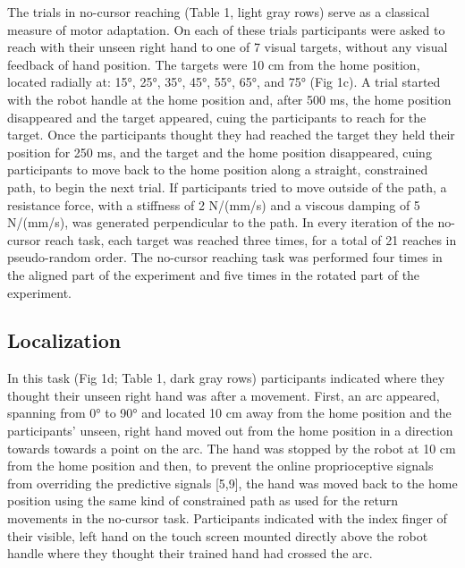 \documentclass[10pt,letterpaper]{article}
\begin{document}
The trials in no-cursor reaching (Table 1, light gray rows) serve as a
classical measure of motor adaptation. On each of these trials
participants were asked to reach with their unseen right hand to one of
7 visual targets, without any visual feedback of hand position. The
targets were 10 cm from the home position, located radially at: 15°,
25°, 35°, 45°, 55°, 65°, and 75° (Fig 1c). A trial started with the
robot handle at the home position and, after 500 ms, the home position
disappeared and the target appeared, cuing the participants to reach for
the target. Once the participants thought they had reached the target
they held their position for 250 ms, and the target and the home
position disappeared, cuing participants to move back to the home
position along a straight, constrained path, to begin the next trial. If
participants tried to move outside of the path, a resistance force, with
a stiffness of 2 N/(mm/s) and a viscous damping of 5 N/(mm/s), was
generated perpendicular to the path. In every iteration of the no-cursor
reach task, each target was reached three times, for a total of 21
reaches in pseudo-random order. The no-cursor reaching task was
performed four times in the aligned part of the experiment and five
times in the rotated part of the experiment.

\subsection{Localization}\label{localization}

In this task (Fig 1d; Table 1, dark gray rows) participants indicated
where they thought their unseen right hand was after a movement. First,
an arc appeared, spanning from 0° to 90° and located 10 cm away from the
home position and the participants' unseen, right hand moved out from
the home position in a direction towards towards a point on the arc. The
hand was stopped by the robot at 10 cm from the home position and then,
to prevent the online proprioceptive signals from overriding the
predictive signals {[}5,9{]}, the hand was moved back to the home
position using the same kind of constrained path as used for the return
movements in the no-cursor task. Participants indicated with the index
finger of their visible, left hand on the touch screen mounted directly
above the robot handle where they thought their trained hand had crossed
the arc.
\end{document}
